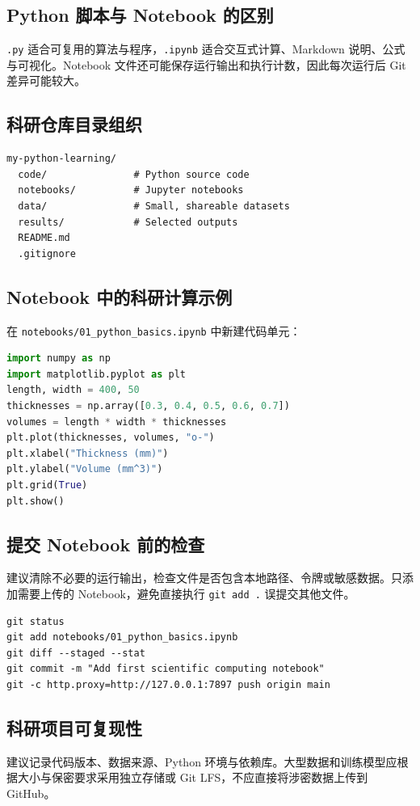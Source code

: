 \subsection{Python 脚本与 Notebook 的区别}
\texttt{.py} 适合可复用的算法与程序，\texttt{.ipynb} 适合交互式计算、Markdown 说明、公式与可视化。Notebook 文件还可能保存运行输出和执行计数，因此每次运行后 Git 差异可能较大。
\subsection{科研仓库目录组织}
\begin{lstlisting}
my-python-learning/
  code/               # Python source code
  notebooks/          # Jupyter notebooks
  data/               # Small, shareable datasets
  results/            # Selected outputs
  README.md
  .gitignore
\end{lstlisting}
\subsection{Notebook 中的科研计算示例}
在 \texttt{notebooks/01\_python\_basics.ipynb} 中新建代码单元：
\begin{lstlisting}[language=Python]
import numpy as np
import matplotlib.pyplot as plt
length, width = 400, 50
thicknesses = np.array([0.3, 0.4, 0.5, 0.6, 0.7])
volumes = length * width * thicknesses
plt.plot(thicknesses, volumes, "o-")
plt.xlabel("Thickness (mm)")
plt.ylabel("Volume (mm^3)")
plt.grid(True)
plt.show()
\end{lstlisting}
\subsection{提交 Notebook 前的检查}
建议清除不必要的运行输出，检查文件是否包含本地路径、令牌或敏感数据。只添加需要上传的 Notebook，避免直接执行 \texttt{git add .} 误提交其他文件。
\begin{lstlisting}
git status
git add notebooks/01_python_basics.ipynb
git diff --staged --stat
git commit -m "Add first scientific computing notebook"
git -c http.proxy=http://127.0.0.1:7897 push origin main
\end{lstlisting}
\subsection{科研项目可复现性}
建议记录代码版本、数据来源、Python 环境与依赖库。大型数据和训练模型应根据大小与保密要求采用独立存储或 Git LFS，不应直接将涉密数据上传到 GitHub。

